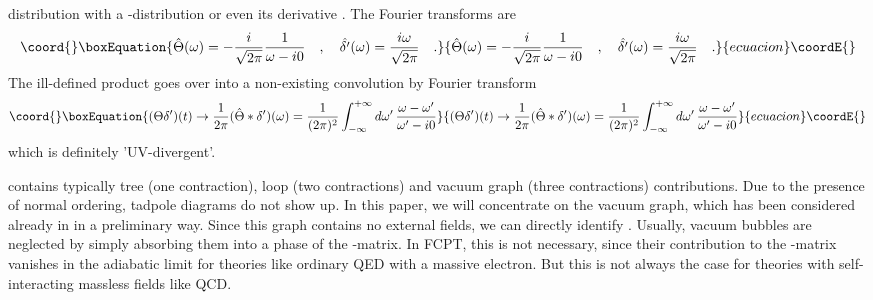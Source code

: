 \documentclass[a4paper,11pt]{article}
\begin{document}
distribution \coordHE{} with
a \myHighlight{$\delta$}\coordHE{}-distribution \coordHE{} or even its
derivative \coordHE{}. The Fourier transforms are
\begin{equation}\coord{}\boxEquation{
\hat{\Theta}(\omega)=-\frac{i}{\sqrt{2 \pi}} \frac{1}{\omega-i0} \quad ,
\quad \hat{\delta'}(\omega)=\frac{i\omega}{\sqrt{2 \pi}} \quad .
}{
\hat{\Theta}(\omega)=-\frac{i}{\sqrt{2 \pi}} \frac{1}{\omega-i0} \quad ,
\quad \hat{\delta'}(\omega)=\frac{i\omega}{\sqrt{2 \pi}} \quad .
}{ecuacion}\coordE{}\end{equation}
The ill-defined product \coordHE{} goes over into a 
non-existing convolution by Fourier transform
\begin{equation}\coord{}\boxEquation{
(\Theta\delta')(t) \rightarrow \frac{1}{2 \pi} (\hat\Theta \ast
\delta')(\omega)=\frac{1}{(2 \pi)^2} \int_{-\infty}^{+\infty}
d\omega' \, \frac{\omega-\omega'}
{\omega'-i0}
}{
(\Theta\delta')(t) \rightarrow \frac{1}{2 \pi} (\hat\Theta \ast
\delta')(\omega)=\frac{1}{(2 \pi)^2} \int_{-\infty}^{+\infty}
d\omega' \, \frac{\omega-\omega'}
{\omega'-i0}
}{ecuacion}\coordE{}\end{equation}
which is definitely 'UV-divergent'.

\coordHE{} contains typically
tree (one contraction), loop (two contractions) and vacuum graph (three 
contractions)
contributions. Due to the presence of normal ordering, tadpole diagrams do not 
show up. In this paper, we will concentrate on the
vacuum graph, which has been considered already in \cite{nuovoc} in a
preliminary way.
Since this graph contains no external fields, we can directly
identify \coordHE{}. Usually, vacuum bubbles
are neglected by simply absorbing them into a phase of the \coordHE{}-matrix. In
FCPT, this is not necessary, since their contribution to the \coordHE{}-matrix
vanishes in the adiabatic limit for theories like ordinary QED with a
massive electron. But this is not always the case for theories with
self-interacting massless fields like QCD.
\end{document}
